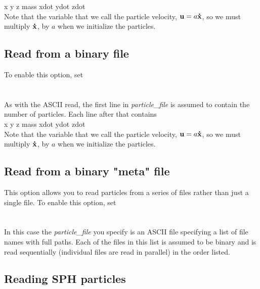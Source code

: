 x y z mass xdot ydot zdot \\

Note that the variable that we call the particle velocity, ${\mathbf u} = a {\bf \dot{x}}$, 
so we must multiply ${\bf \dot{x}}$, by $a$ when we initialize the particles.

\subsection{Read from a binary file}

To enable this option, set \\

 \\
 \\

As with the ASCII read, the first line in {\em particle\_file} is
assumed to contain the number of particles.  Each line after that contains  \\

x y z mass xdot ydot zdot \\

Note that the variable that we call the particle velocity, ${\mathbf u} = a {\bf \dot{x}}$, 
so we must multiply ${\bf \dot{x}}$, by $a$ when we initialize the particles.

\subsection{Read from a binary "meta" file}

This option allows you to read particles from a series of files rather than 
just a single file.   To enable this option, set \\

 \\
 \\

In this case the {\em particle\_file} you specify is an ASCII file specifying a
list of file names with full paths.   Each of the files in this list is assumed
to be binary and is read sequentially (individual files are read in parallel) in 
the order listed.

\subsection{Reading SPH particles}

